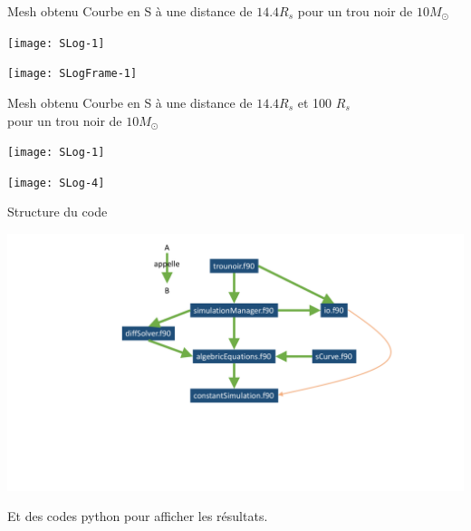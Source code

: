 \documentclass{beamer}
\begin{document}
\begin{frame}{Mesh obtenu}
	\centering Courbe en S à une distance de $14.4 R_s$ pour un trou noir de $10 M_{\odot}$
	\begin{minipage}[c]{.49\linewidth}
      \texttt{[image: SLog-1]}
   \end{minipage} \hfill
   \pause
   \begin{minipage}[c]{.49\linewidth}
      \texttt{[image: SLogFrame-1]}
   \end{minipage}
\end{frame}

\begin{frame}{Mesh obtenu}
	\centering Courbe en S à une distance de $14.4 R_s$ et 100 $R_s$\\ pour un trou noir de $10 M_{\odot}$
	\\
	\begin{minipage}[c]{.49\linewidth}
      \texttt{[image: SLog-1]}
   \end{minipage} \hfill
   \begin{minipage}[c]{.49\linewidth}
      \texttt{[image: SLog-4]}
   \end{minipage}
\end{frame}



\begin{frame}{Structure du code}

\includegraphics[width = 1.0\linewidth]{images/structure.pdf}

Et des codes python pour afficher les résultats.
\end{frame}
\end{document}
